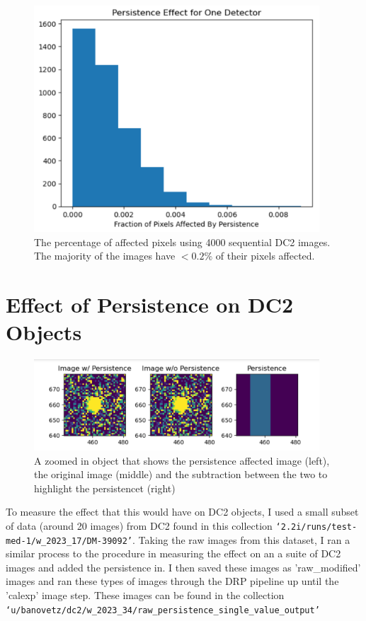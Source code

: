 \documentclass[DM,authoryear,toc]{lsstdoc}
\begin{document}
\begin{figure}[!htp]
  \centering
  \includegraphics[width=0.95\textwidth, angle=0]{DC2_percent_affected_pixels.png}
  \caption{
  The percentage of affected pixels using 4000 sequential DC2 images. The majority of the images have $<0.2\%$ of their pixels affected. 
  }
\label{fig:affected_pixels}
\end{figure}


\section {Effect of Persistence on DC2 Objects}

\begin{figure}[!htp]
  \centering
  \includegraphics[width=0.95\textwidth, angle=0]{Obj_pers.png}
  \caption{
  A zoomed in object that shows the persistence affected image (left), the original image (middle) 
  and the subtraction between the two to highlight the persistencet (right)
  }
\label{fig:obj_persistence}
\end{figure}

To measure the effect that this would have on DC2 objects, I used a small subset of data (around 20 images) from DC2 
found in this collection \texttt{`2.2i/runs/test-med-1/w_2023_17/DM-39092'}. 
Taking the raw images from this dataset, 
I ran a similar process to the procedure in measuring the effect on an a suite of DC2 images and added the persistence in. 
I then saved these images as 'raw_modified' images and ran these types of images through the DRP pipeline up until the 'calexp' image step.
These images can be found in the collection \texttt{`u/banovetz/dc2/w_2023_34/raw_persistence_single_value_output'}
\end{document}
